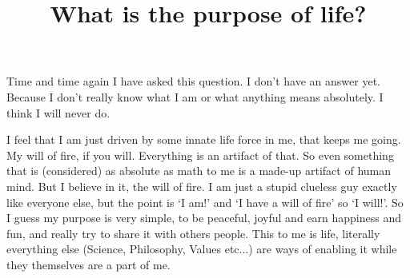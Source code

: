 \documentclass[12pt]{article}
\title{What is the purpose of life?}
\author{}
\date{}
\begin{document}
\maketitle

Time and time again I have asked this question.
I don't have an answer yet.
Because I don't really know what I am or what anything means absolutely.
I think I will never do.

I feel that I am just driven by some innate life force in me, that keeps me going.
My will of fire, if you will.
Everything is an artifact of that.
So even something that is (considered) as absolute as math to me is a made-up artifact of human mind.
But I believe in it, the will of fire.
I am just a stupid clueless guy exactly like everyone else, but the point is `I am!' and `I have a will of fire' so `I will!'.
So I guess my purpose is very simple, to be peaceful, joyful and earn happiness and fun, and really try to share it with others people.
This to me is life, literally everything else (Science, Philosophy, Values etc...) are ways of enabling it while they themselves are a part of me.
\end{document}
